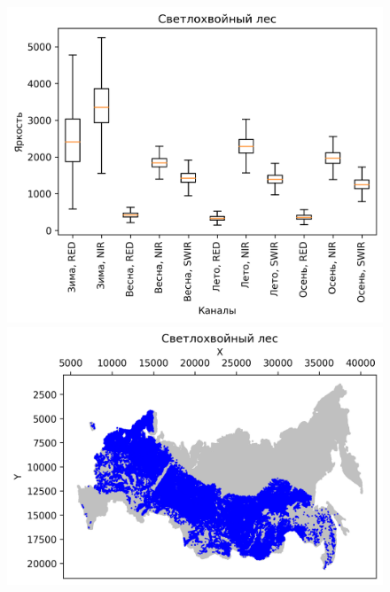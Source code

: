 \documentclass[14pt, a4paper, oneside]{extarticle}
\begin{document}
\begin{figure}[H]
    \centering
    \includegraphics[]{class-2-boxplot}
    \includegraphics[]{class-2-map}
\end{figure}
\end{document}
